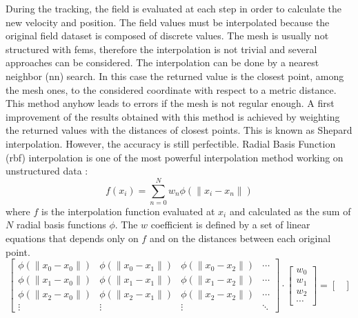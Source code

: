 \begin{refsection}
  During the tracking, the field is evaluated at each step in order to calculate the new velocity and position. The field values must be interpolated because the original field dataset is composed of discrete values. The mesh is usually not structured with \acrshort{fem}s, therefore the interpolation is not trivial and several approaches can be considered. The interpolation can be done by a nearest neighbor (\acrshort{nn}) search. In this case the returned value is the closest point, among the mesh ones, to the considered coordinate with respect to a metric distance. This method anyhow leads to errors if the mesh is not regular enough. A first improvement of the results obtained with this method is achieved by weighting the returned values with the distances of closest points. This is known as Shepard interpolation. However, the accuracy is still perfectible. Radial Basis Function (\acrshort{rbf}) interpolation is one of the most powerful interpolation method working on unstructured data \cite{Wright2003}:
  \begin{equation}
    f(x_{i}) = \sum_{n=0}^{N} w_{n} \phi(\lVert x_{i} - x_{n}\rVert)
  \end{equation}
  where $f$ is the interpolation function evaluated at $x_{i}$ and calculated as the sum of $N$ radial basis functions $\phi$. The $w$ coefficient is defined by a set of linear equations that depends only on $f$ and on the distances between each original point.
  \begin{equation}
    \begin{bmatrix}
      \phi(\lVert x_{0} - x_{0}\rVert) & \phi(\lVert x_{0} - x_{1}\rVert) & \phi(\lVert x_{0} - x_{2}\rVert) & \cdots \\
      \phi(\lVert x_{1} - x_{0}\rVert) & \phi(\lVert x_{1} - x_{1}\rVert) & \phi(\lVert x_{1} - x_{2}\rVert) & \cdots \\
      \phi(\lVert x_{2} - x_{0}\rVert) & \phi(\lVert x_{2} - x_{1}\rVert) & \phi(\lVert x_{2} - x_{2}\rVert) & \cdots \\
      \vdots                           & \vdots                           & \vdots                           & \ddots
    \end{bmatrix}
    \cdot
    \begin{bmatrix}
      w_{0} \\
      w_{1} \\
      w_{2} \\
      \cdots
    \end{bmatrix}
    =
    \begin{bmatrix}

\end{bmatrix}
\end{equation}
\end{refsection}
